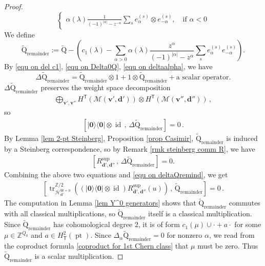 \documentclass[10pt]{amsart}
\theoremstyle{definition}
\numberwithin{equation}{section}
\newcommand{\sQ}{\mathrm{Q}}
\newcommand{\bZ}{\mathbb{Z}}
\newcommand{\bv}{\mathbf{v}}
\newcommand{\bd}{\mathbf{d}}
\newcommand{\cH}{\mathcal{H}}
\newcommand{\cM}{\mathcal{M}}
\newcommand{\sT}{\mathsf{T}}
\newcommand{\sW}{\mathsf{W}}
\newcommand{\pt}{\operatorname{pt}}
\newcommand{\tr}{\operatorname{tr}}
\newcommand{\id}{\operatorname{id}}
\begin{document}
\begin{proof}
\begin{equation}
\begin{cases}
\alpha(\lambda)\frac{1}{(-1)^{|\alpha|}-z^{-\alpha}}\sum_{s} e_{\alpha}^{(s)}\otimes e_{-\alpha}^{(s)}, \quad \mathrm{if}\,\, \alpha< 0
\end{cases} \end{equation}
We define 
$$ \widetilde{\sQ}_{\mathrm{remainder}}:= \widetilde{\sQ}-\left( c_1(\lambda)-\sum_{\alpha>0} \alpha(\lambda)\frac{z^\alpha}{(-1)^{|\alpha|}-z^\alpha}\sum_{s} 
e_{\alpha}^{(s)} e_{-\alpha}^{(s)}\right). $$
By \eqref{equ on del c1}, \eqref{equ on Delta0Q}, \eqref{equ on deltaalpha}, 
we have 
\begin{equation}\label{equ on deltaQremind}\Delta \widetilde{\sQ}_{\mathrm{remainder}}=\widetilde{\sQ}_{\mathrm{remainder}}\otimes 1+1\otimes \widetilde{\sQ}_{\mathrm{remainder}}+\text{a scalar operator}. \end{equation}
$\Delta\widetilde{\sQ}_{\mathrm{remainder}}$ preserves the weight space decomposition
\begin{align*}
    \bigoplus_{\bv',\bv''}H^{\sT}(\cM(\bv',\bd'))\otimes H^{\sT}(\cM(\bv'',\bd''))\,,
\end{align*}
so
\begin{align*}
\left[|\mathbf 0\rangle\langle\mathbf 0|\otimes \id\,,\, \Delta\widetilde{\sQ}_{\mathrm{remainder}}\right]=0\,.
\end{align*}
By Lemma \ref{lem 2-pt Steinberg}, Proposition \ref{prop Casimir}, $\widetilde{\sQ}_{\mathrm{remainder}}$ is induced by a Steinberg correspondence, so by Remark \ref{rmk steinberg comm R}, we have
\begin{align*}
\left[R^{\mathrm{sup}}_{\bd',\bd''}\,,\, \Delta\widetilde{\sQ}_{\mathrm{remainder}}\right]=0.
\end{align*}
Combining the above two equations and \eqref{equ on deltaQremind}, we get
\begin{align*}
\left[\tr_{\cH^{\sW=0}_{\bd'}}^{\bZ/2}\left((|\mathbf 0\rangle\langle\mathbf 0|\otimes \id)R^{\mathrm{sup}}_{\bd',\bd''}(u)\right)\,,\, \widetilde{\sQ}_{\mathrm{remainder}}\right]=0\,.
\end{align*}
The computation in Lemma \ref{lem Y^0 generators} shows that $\widetilde{\sQ}_{\mathrm{remainder}}$ commutes with all classical multiplications, so $\widetilde{\sQ}_{\mathrm{remainder}}$ itself is a classical multiplication. Since $\widetilde{\sQ}_{\mathrm{remainder}}$ has cohomological degree $2$, it is of form $c_1(\mu)\cup\cdot+a\cdot$ for some $\mu\in \bZ^{Q_0}$ and $a\in H^2_\sT(\pt)$. Since $\Delta_\alpha\widetilde{\sQ}_{\mathrm{remainder}}=0$ for nonzero $\alpha$, we read from the coproduct formula \eqref{coproduct for 1st Chern class} that $\mu$ must be zero. Thus $\widetilde{\sQ}_{\mathrm{remainder}}$ is a scalar multiplication.

\end{proof}
\end{document}
